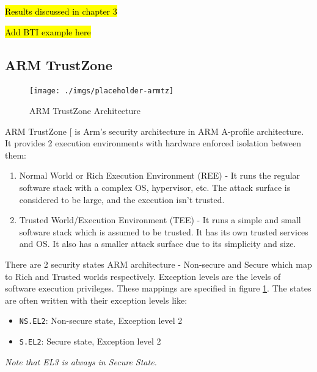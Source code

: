 \documentclass[a4paper, nobind]{templates/ociamthesis}
\providecommand{\tightlist}{%
  \setlength{\itemsep}{0pt}\setlength{\parskip}{0pt}}
\begin{document}
\hl{Results discussed in chapter 3}

\hl{Add BTI example here}

\subsection{ARM TrustZone}\label{arm-trustzone}

\begin{figure}[H]

{\centering \texttt{[image: ./imgs/placeholder-armtz]} 

}

\caption{ARM TrustZone Architecture}\label{fig:armtz-arch}
\end{figure}

ARM TrustZone {[}\citeproc{ref-armtz}{7}{]} is Arm's security architecture in ARM A-profile architecture.
It provides 2 execution environments with hardware enforced isolation between them:

\begin{enumerate}
\def\labelenumi{\arabic{enumi}.}
\tightlist
\item
  Normal World or Rich Execution Environment (REE) - It runs the regular software
  stack with a complex OS, hypervisor, etc. The attack surface is considered to be large,
  and the execution isn't trusted.
\item
  Trusted World/Execution Environment (TEE) - It runs a simple and small software
  stack which is assumed to be trusted. It has its own trusted services and OS.
  It also has a smaller attack surface due to its simplicity and size.
\end{enumerate}

There are 2 security states ARM architecture - Non-secure and Secure which map
to Rich and Trusted worlds respectively.
Exception levels are the levels of software execution privileges.
These mappings are specified in figure \ref{fig:armtz-arch}.
The states are often written with their exception levels like:

\begin{itemize}
\tightlist
\item
  \texttt{NS.EL2}: Non-secure state, Exception level 2
\item
  \texttt{S.EL2}: Secure state, Exception level 2
\end{itemize}

\emph{Note that EL3 is always in Secure State.}
\end{document}
